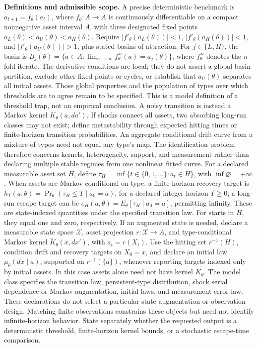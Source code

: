 \documentclass[11pt,a4paper]{article}
\begin{document}
\textbf{Definitions and admissible scope.} A precise deterministic benchmark is \(a_{t+1}=f_\theta(a_t)\), where \(f_\theta:A\to A\) is continuously differentiable on a compact nonnegative asset interval \(A\), with three designated fixed points \(a_L(\theta)<a_U(\theta)<a_H(\theta)\). Require \(|f'_\theta(a_L(\theta))|<1\), \(|f'_\theta(a_H(\theta))|<1\), and \(|f'_\theta(a_U(\theta))|>1\), plus stated basins of attraction. For \(j\in\{L,H\}\), the basin is \(B_j(\theta)=\{a\in A:\lim_{n\to\infty}f_\theta^{\,n}(a)=a_j(\theta)\}\), where \(f_\theta^{\,n}\) denotes the \(n\)-fold iterate. The derivative conditions are local; they do not assert a global basin partition, exclude other fixed points or cycles, or establish that \(a_U(\theta)\) separates all initial assets. Those global properties and the population of types over which thresholds are to agree remain to be specified. This is a model definition of a threshold trap, not an empirical conclusion. A noisy transition is instead a Markov kernel \(K_\theta(a,da')\). If shocks connect all assets, two absorbing long-run classes may not exist; define metastability through expected hitting times or finite-horizon transition probabilities. An aggregate conditional drift curve from a mixture of types need not equal any type's map. The identification problem therefore concerns kernels, heterogeneity, support, and measurement rather than declaring multiple stable regimes from one nonlinear fitted curve. For a declared measurable asset set \(H\), define \(\tau_H=\inf\{t\in\{0,1,\ldots\}:a_t\in H\}\), with \(\inf\varnothing=+\infty\). When assets are Markov conditional on type, a finite-horizon recovery target is \(h_T(a,\theta)=\Pr_\theta(\tau_H\le T\mid a_0=a)\), for a declared integer horizon \(T\ge0\); a long-run escape target can be \(e_H(a,\theta)=E_\theta[\tau_H\mid a_0=a]\), permitting infinity. These are state-indexed quantities under the specified transition law. For starts in \(H\), they equal one and zero, respectively. If an augmented state is needed, declare a measurable state space \(\mathcal X\), asset projection \(r:\mathcal X\to A\), and type-conditional Markov kernel \(\widetilde K_\theta(x,dx')\), with \(a_t=r(X_t)\). Use the hitting set \(r^{-1}(H)\), condition drift and recovery targets on \(X_0=x\), and declare an initial law \(\mu_\theta(dx\mid a)\), supported on \(r^{-1}(\{a\})\), whenever reporting targets indexed only by initial assets. In this case assets alone need not have kernel \(K_\theta\). The model class specifies the transition law, persistent-type distribution, shock serial dependence or Markov augmentation, initial laws, and measurement-error law. These declarations do not select a particular state augmentation or observation design. Matching finite observations constrains these objects but need not identify infinite-horizon behavior. State separately whether the requested output is a deterministic threshold, finite-horizon kernel bounds, or a stochastic escape-time comparison.
\end{document}
